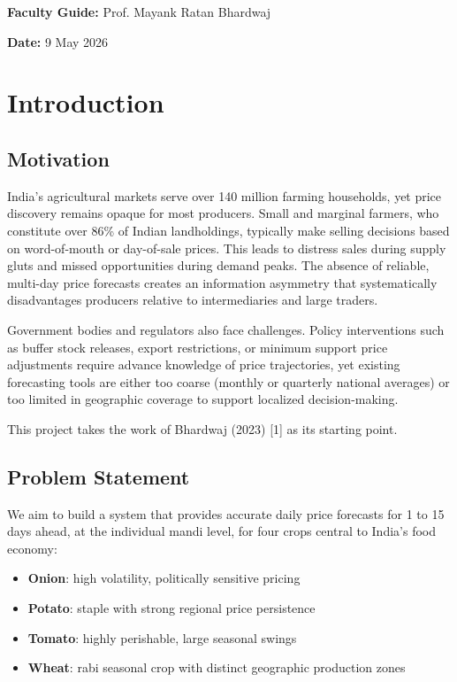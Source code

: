 \documentclass[conference]{IEEEtran}
\begin{document}
\textbf{Faculty Guide:} Prof. Mayank Ratan Bhardwaj

\textbf{Date:} 9 May 2026

\section{Introduction}

\subsection{Motivation}

India's agricultural markets serve over 140 million farming households, yet price discovery remains opaque for most producers. Small and marginal farmers, who constitute over 86\% of Indian landholdings, typically make selling decisions based on word-of-mouth or day-of-sale prices. This leads to distress sales during supply gluts and missed opportunities during demand peaks. The absence of reliable, multi-day price forecasts creates an information asymmetry that systematically disadvantages producers relative to intermediaries and large traders.

Government bodies and regulators also face challenges. Policy interventions such as buffer stock releases, export restrictions, or minimum support price adjustments require advance knowledge of price trajectories, yet existing forecasting tools are either too coarse (monthly or quarterly national averages) or too limited in geographic coverage to support localized decision-making.

This project takes the work of Bhardwaj (2023) [1] as its starting point.

\subsection{Problem Statement}

We aim to build a system that provides accurate daily price forecasts for 1 to 15 days ahead, at the individual mandi level, for four crops central to India's food economy:

\begin{itemize}
\item \textbf{Onion}: high volatility, politically sensitive pricing
\item \textbf{Potato}: staple with strong regional price persistence
\item \textbf{Tomato}: highly perishable, large seasonal swings
\item \textbf{Wheat}: rabi seasonal crop with distinct geographic production zones
\end{itemize}
\end{document}
